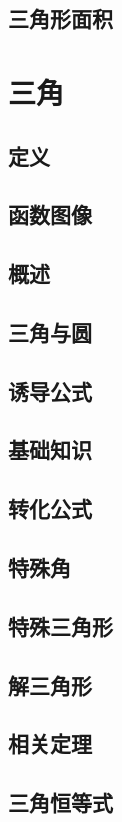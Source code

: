 \documentclass[UTF8]{ctexart}
\begin{document}
\subsection{三角形面积}

\newpage

\section{三角}

\subsection{定义}
\subsection{函数图像}
\subsection{概述}
\subsection{三角与圆}
\subsection{诱导公式}
\subsection{基础知识}
\subsection{转化公式}
\subsection{特殊角}
\subsection{特殊三角形}
\subsection{解三角形}
\subsection{相关定理}
\subsection{三角恒等式}
\end{document}
